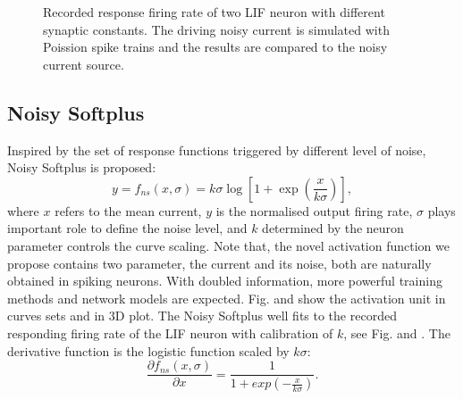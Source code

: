 \documentclass[runningheads,a4paper]{llncs}
\begin{document}
\begin{figure}[bt!]
	\centering
	\caption{
	Recorded response firing rate of two LIF neuron with different synaptic constants.
	The driving noisy current is simulated with Poission spike trains and the results are compared to the noisy current source.}
	\label{fig:lif_pois}	
\end{figure}

\subsection{Noisy Softplus}
Inspired by the set of response functions triggered by different level of noise, Noisy Softplus is proposed:
\begin{equation}
y = f_{ns}(x, \sigma) = k \sigma \log [1 + \exp(\frac{x}{k \sigma})],
\label{equ:nsp}
\end{equation}
where $x$ refers to the mean current, $y$ is the normalised output firing rate, $\sigma$ plays important role to define the noise level, and $k$ determined by the neuron parameter controls the curve scaling.
Note that, the novel activation function we propose contains two parameter, the current and its noise, both are naturally obtained in spiking neurons.
With doubled information, more powerful training methods and network models are expected. 
Fig. and  show the activation unit in curves sets and in 3D plot.
The Noisy Softplus well fits to the recorded responding firing rate of the LIF neuron with calibration of $k$, see Fig. and .
The derivative function is the logistic function scaled by $k\sigma$:
\begin{equation}
\frac{\partial f_{ns}(x,\sigma)}{\partial x} = \frac{1}{1+exp(-\frac{x}{k\sigma})}.
\label{equ:logist}
\end{equation}
\end{document}
